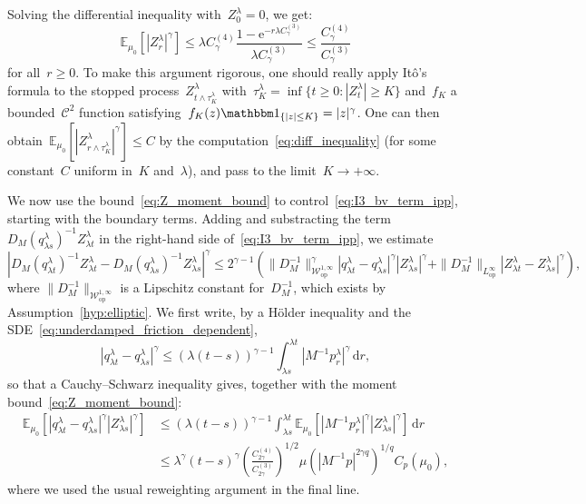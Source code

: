 \documentclass[10pt]{article}
\renewcommand{\d}{\mathrm{d}}
\newcommand{\e}{\mathrm{e}}
\newcommand{\E}{\mathbb{E}}
\newcommand{\1}{\mathbbm 1}
\newcommand{\cW}{\mathcal{W}}
\begin{document}
Solving the differential inequality with~$Z_0^\lambda=0$, we get:
\begin{equation}
    \label{eq:Z_moment_bound}
    \E_{\mu_0}\left[|Z_r^\lambda|^\gamma\right] \leq \lambda C^{(4)}_{\gamma}\frac{1-\e^{-r \lambda C^{(3)}_{\gamma}}}{\lambda C^{(3)}_{\gamma}} \leq \frac{C_\gamma^{(4)}}{C_\gamma^{(3)}}
\end{equation}
for all~$r\geq 0$. To make this argument rigorous, one should really apply It\^o's formula to the stopped process~$Z^\lambda_{t\land \tau^\lambda_K}$ with~$\tau^\lambda_K = \inf\{t\geq 0: |Z_t^\lambda|\geq K\}$ and~$f_K$ a bounded~$\mathcal C^2$ function satisfying~$f_K(z)\1_{\{|z|\leq K\}} = |z|^\gamma$. One can then obtain~$\E_{\mu_0}\left[|Z^\lambda_{r\land \tau_K^\lambda}|^\gamma\right]\leq C$ by the computation~\eqref{eq:diff_inequality} (for some constant~$C$ uniform in~$K$ and~$\lambda$), and pass to the limit~$K\to+\infty$.

We now use the bound~\eqref{eq:Z_moment_bound} to control~\eqref{eq:I3_bv_term_ipp}, starting with the boundary terms. Adding and substracting the term $D_M(q_{\lambda s}^\lambda)^{-1}Z_{\lambda t}^\lambda$ in the right-hand side of~\eqref{eq:I3_bv_term_ipp}, we estimate
\begin{equation}
    \label{eq:I3_telescoping_bound}
        |D_M(q_{\lambda t}^\lambda)^{-1} Z_{\lambda t}^\lambda - D_M(q_{\lambda s}^\lambda)^{-1}Z_{\lambda s}^\lambda|^\gamma\leq 2^{\gamma-1}\left( \|D_M^{-1}\|_{\cW_{\mathrm{op}}^{1,\infty}}^\gamma|q_{\lambda t}^\lambda-q_{\lambda s}^\lambda|^\gamma|Z_{\lambda s}^\lambda|^\gamma+\|D_M^{-1}\|_{L^\infty_{\mathrm{op}}}|Z_{\lambda t}^\lambda - Z_{\lambda s}^\lambda|^\gamma\right),
\end{equation}
where $\|D_M^{-1}\|_{\cW_{\mathrm{op}}^{1,\infty}}$ is a Lipschitz constant for~$D_M^{-1}$, which exists by Assumption~\ref{hyp:elliptic}. 
We first write, by a H\"older inequality and the SDE~\eqref{eq:underdamped_friction_dependent},
\begin{equation}
    |q_{\lambda t}^\lambda-q_{\lambda s}^\lambda|^\gamma \leq (\lambda(t-s))^{\gamma -1}\int_{\lambda s}^{\lambda t}| M^{-1}p_r^\lambda|^\gamma\,\d r,
\end{equation}
so that a Cauchy--Schwarz inequality gives, together with the moment bound~\eqref{eq:Z_moment_bound}:
\begin{equation}
    \begin{aligned}
        \label{eq:I3_telescoping_bound_q_incr}
        \E_{\mu_0}\left[|q_{\lambda t}^\lambda-q_{\lambda s}^\lambda|^\gamma|Z_{\lambda s}^\lambda|^\gamma\right]&\leq (\lambda(t-s))^{\gamma -1}\int_{\lambda s}^{\lambda t}\E_{\mu_0}\left[|M^{-1}p_r^\lambda|^\gamma|Z_{\lambda s}^\lambda|^\gamma\right]\,\d r\\
        &\leq \lambda^\gamma(t-s)^\gamma\left(\frac{C_{2\gamma}^{(4)}}{C_{2\gamma}^{(3)}}\right)^{1/2}\mu\left(\left|M^{-1}p\right|^{2\gamma q}\right)^{1/q}C_p(\mu_0),
    \end{aligned}
\end{equation}
where we used the usual reweighting argument in the final line.
\end{document}
